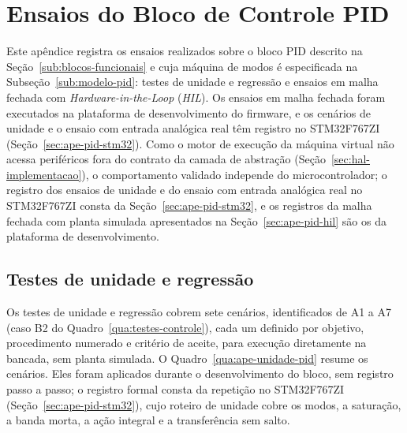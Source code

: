 \chapter{Ensaios do Bloco de Controle PID}
\label{ape:pid}

Este apêndice registra os ensaios realizados sobre o bloco PID descrito na Seção~\ref{sub:blocos-funcionais} e cuja máquina de modos é especificada na Subseção~\ref{sub:modelo-pid}: testes de unidade e regressão e ensaios em malha fechada com \textit{Hardware-in-the-Loop} (\textit{HIL}).
Os ensaios em malha fechada foram executados na plataforma de desenvolvimento do firmware, e os cenários de unidade e o ensaio com entrada analógica real têm registro no STM32F767ZI (Seção~\ref{sec:ape-pid-stm32}).
Como o motor de execução da máquina virtual não acessa periféricos fora do contrato da camada de abstração (Seção~\ref{sec:hal-implementacao}), o comportamento validado independe do microcontrolador; o registro dos ensaios de unidade e do ensaio com entrada analógica real no STM32F767ZI consta da Seção~\ref{sec:ape-pid-stm32}, e os registros da malha fechada com planta simulada apresentados na Seção~\ref{sec:ape-pid-hil} são os da plataforma de desenvolvimento.

\section{Testes de unidade e regressão}
\label{sec:ape-pid-unidade}

Os testes de unidade e regressão cobrem sete cenários, identificados de A1 a A7 (caso B2 do Quadro~\ref{qua:testes-controle}), cada um definido por objetivo, procedimento numerado e critério de aceite, para execução diretamente na bancada, sem planta simulada.
O Quadro~\ref{qua:ape-unidade-pid} resume os cenários.
Eles foram aplicados durante o desenvolvimento do bloco, sem registro passo a passo; o registro formal consta da repetição no STM32F767ZI (Seção~\ref{sec:ape-pid-stm32}), cujo roteiro de unidade cobre os modos, a saturação, a banda morta, a ação integral e a transferência sem salto.

